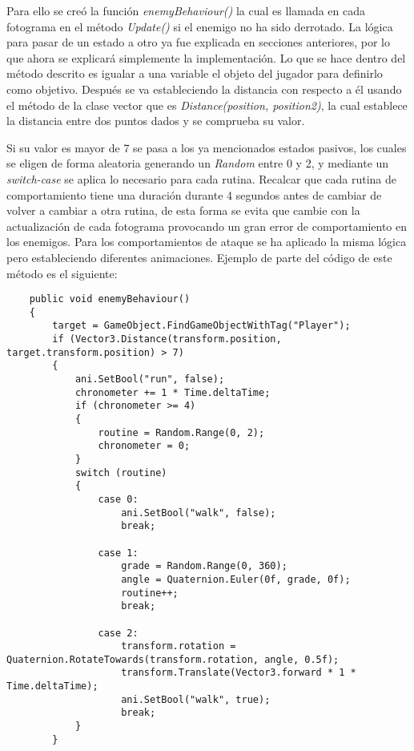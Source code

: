 Para ello se creó la función \textit{enemyBehaviour()} la cual es llamada en cada fotograma en el método \textit{Update()} si el enemigo no ha sido derrotado. La lógica para pasar de un estado a otro ya fue explicada en secciones anteriores, por lo que ahora se explicará simplemente la implementación. Lo que se hace dentro del método descrito es igualar a una variable el objeto del jugador para definirlo como objetivo. Después se va estableciendo la distancia con respecto a él usando el método de la clase vector que es \textit{Distance(position, position2)}, la cual establece la distancia entre dos puntos dados y se comprueba su valor. 

Si su valor es mayor de 7 se pasa a los ya mencionados estados pasivos, los cuales se eligen de forma aleatoria generando un \textit{Random} entre 0 y 2, y mediante un \textit{switch-case} se aplica lo necesario para cada rutina. Recalcar que cada rutina de comportamiento tiene una duración durante 4 segundos antes de cambiar de volver a cambiar a otra rutina, de esta forma se evita que cambie con la actualización de cada fotograma provocando un gran error de comportamiento en los enemigos. Para los comportamientos de ataque se ha aplicado la misma lógica pero estableciendo diferentes animaciones. Ejemplo de parte del código de este método es el siguiente:

\begin{lstlisting}
    public void enemyBehaviour()
    {
        target = GameObject.FindGameObjectWithTag("Player");
        if (Vector3.Distance(transform.position, target.transform.position) > 7)
        {
            ani.SetBool("run", false);
            chronometer += 1 * Time.deltaTime;
            if (chronometer >= 4)
            {
                routine = Random.Range(0, 2);
                chronometer = 0;
            }
            switch (routine)
            {
                case 0:
                    ani.SetBool("walk", false);
                    break;

                case 1:
                    grade = Random.Range(0, 360);
                    angle = Quaternion.Euler(0f, grade, 0f);
                    routine++;
                    break;

                case 2:
                    transform.rotation = Quaternion.RotateTowards(transform.rotation, angle, 0.5f);
                    transform.Translate(Vector3.forward * 1 * Time.deltaTime);
                    ani.SetBool("walk", true);
                    break;
            }
        }
\end{lstlisting}

